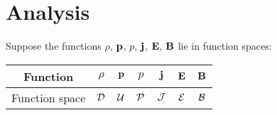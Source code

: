 \section{Analysis}

    Suppose the functions $\rho$, $\mathbf{p}$, $p$, $\mathbf{j}$, $\mathbf{E}$, $\mathbf{B}$ lie in function spaces: 
    \begin{center}\begin{tabular}{ c || c c c c c c }
        Function  &  $\rho$  &  $\mathbf{p}$  &  $p$  &  $\mathbf{j}$  &  $\mathbf{E}$  &  $\mathbf{B}$  \\
        \hline
        Function space  &  $\mathcal{D}$  &  $\mathcal{U}$  &  $\mathcal{P}$  &  $\mathcal{J}$  &  $\mathcal{E}$  &  $\mathcal{B}$  \\
    \end{tabular}\end{center}


    
    
